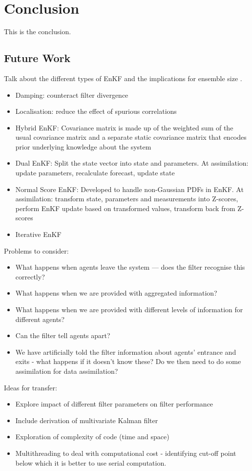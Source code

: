 \chapter{Conclusion}\label{ch:conclusion}

This is the conclusion.

\section{Future Work}\label{sec:conc:future}

Talk about the different types of EnKF and the implications for ensemble size
\citep{keller2018comparing}.
\begin{itemize}
    \item Damping: counteract filter divergence
    \item Localisation: reduce the effect of spurious correlations
    \item Hybrid EnKF: Covariance matrix is made up of the weighted sum of the
        usual covariance matrix and a separate static covariance matrix that
        encodes prior underlying knowledge about the system
    \item Dual EnKF: Split the state vector into state and parameters. At
        assimilation: update parameters, recalculate forecast, update state
    \item Normal Score EnKF: Developed to handle non-Gaussian PDFs in EnKF. At
        assimilation: transform state, parameters and measurements into
        Z-scores, perform EnKF update based on transformed values, transform
        back from Z-scores
    \item Iterative EnKF
\end{itemize}

Problems to consider:
\begin{itemize}
    \item What happens when agents leave the system --- does the filter
        recognise this correctly?
    \item What happens when we are provided with aggregated information?
    \item What happens when we are provided with different levels of information
        for different agents?
    \item Can the filter tell agents apart?
    \item We have artificially told the filter information about agents'
        entrance and exits - what happens if it doesn't know these? Do we then
        need to do some assimilation for data assimilation?
\end{itemize}

Ideas for transfer:
\begin{itemize}
    \item Explore impact of different filter parameters on filter performance
    \item Include derivation of multivariate Kalman filter
    \item Exploration of complexity of code (time and space)
    \item Multithreading to deal with computational cost - identifying cut-off
        point below which it is better to use serial computation. 
\end{itemize}
